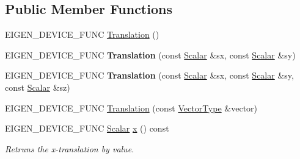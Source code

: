 \subsection*{Public Member Functions}
\begin{DoxyCompactItemize}
\item 
E\+I\+G\+E\+N\+\_\+\+D\+E\+V\+I\+C\+E\+\_\+\+F\+U\+NC \mbox{\hyperlink{class_eigen_1_1_translation_a6220051bf3a13f8180ddefbae198493e}{Translation}} ()
\item 
\mbox{\label{class_eigen_1_1_translation_adbca75cf0faf6b6f0b6876e921032350}} 
E\+I\+G\+E\+N\+\_\+\+D\+E\+V\+I\+C\+E\+\_\+\+F\+U\+NC {\bfseries Translation} (const \mbox{\hyperlink{class_eigen_1_1_translation_ad596bf21ced4b902cc242205df486e21}{Scalar}} \&sx, const \mbox{\hyperlink{class_eigen_1_1_translation_ad596bf21ced4b902cc242205df486e21}{Scalar}} \&sy)
\item 
\mbox{\label{class_eigen_1_1_translation_a785a7d254049976bf02dd43881646af9}} 
E\+I\+G\+E\+N\+\_\+\+D\+E\+V\+I\+C\+E\+\_\+\+F\+U\+NC {\bfseries Translation} (const \mbox{\hyperlink{class_eigen_1_1_translation_ad596bf21ced4b902cc242205df486e21}{Scalar}} \&sx, const \mbox{\hyperlink{class_eigen_1_1_translation_ad596bf21ced4b902cc242205df486e21}{Scalar}} \&sy, const \mbox{\hyperlink{class_eigen_1_1_translation_ad596bf21ced4b902cc242205df486e21}{Scalar}} \&sz)
\item 
E\+I\+G\+E\+N\+\_\+\+D\+E\+V\+I\+C\+E\+\_\+\+F\+U\+NC \mbox{\hyperlink{class_eigen_1_1_translation_a15486f7732b28f0f9e8515de754bc78d}{Translation}} (const \mbox{\hyperlink{class_eigen_1_1_translation_a339e17dfec5394ae563f62cca0df451f}{Vector\+Type}} \&vector)
\item 
\mbox{\label{class_eigen_1_1_translation_a7725474718c60450a7007d1711e58a81}} 
E\+I\+G\+E\+N\+\_\+\+D\+E\+V\+I\+C\+E\+\_\+\+F\+U\+NC \mbox{\hyperlink{class_eigen_1_1_translation_ad596bf21ced4b902cc242205df486e21}{Scalar}} \mbox{\hyperlink{class_eigen_1_1_translation_a7725474718c60450a7007d1711e58a81}{x}} () const
\begin{DoxyCompactList}\small\item\em Retruns the x-\/translation by value. \end{DoxyCompactList}\item 
\mbox{\label{class_eigen_1_1_translation_a8fa354dd285528cc48555054ccbd7e4c}} 

\end{DoxyCompactItemize}
